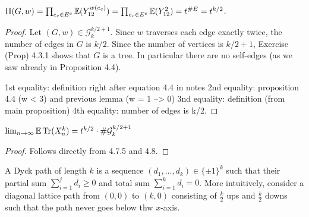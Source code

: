 \begin{proposition}%
  \label{prop:product_g_w_to_exponential}
  \notready
  $\Pi(G,w) = \prod_{e_c\in E^c} {\mathbb{E}}(Y_{12}^{w(e_c)}) = \prod_{e_c\in E^c} {\mathbb{E}}(Y_{12}^2) = t^{\#E} = t^{k/2}$.
\end{proposition}

\begin{proof}
  \notready
  Let $(G,w)\in\mathcal{G}^{k/2+1}_k$.  Since $w$ traverses each edge exactly twice, the number of edges in $G$ is $k/2$.  Since the number of vertices is $k/2+1$, Exercise (Prop) 4.3.1 shows that $G$ is a tree.  In particular there are no self-edges (as we saw already in Proposition 4.4).

  1st equality: definition right after equation 4.4 in notes
  2nd equality: proposition 4.4 (w < 3) and previous lemma (w = 1 --> 0)
  3nd equality: definition (from main proposition)
  4th equality: number of edges is k/2.
\end{proof}




\begin{proposition}%
  \label{prop:trace_ev_limit_equals_t_special_g}
  \notready
  $\lim_{n\to\infty} {\mathbb{E}}\operatorname{Tr}(X_n^k) = t^{k/2}\cdot\#\mathcal{G}_k^{k/2+1}$
\end{proposition}

\begin{proof}
  \notready
  Follows directly from 4.7.5 and 4.8.
\end{proof}





\begin{definition}\label{def:Dyck_paths}
  A Dyck path of length $k$ is a sequence $(d_1,...,d_k) \in \{\pm 1\}^k$ such that their partial sum $\sum_{i=1}^j d_i \geq 0$
  and total sum $\sum_{i = 1}^{k}d_i = 0$. More intuitively, consider a diagonal lattice path from $(0,0)$ to $(k, 0)$ consisting of
  $\frac{k}{2}$ ups and $\frac{k}{2}$ downs such that the path never goes below thw $x$-axis.
\end{definition}


